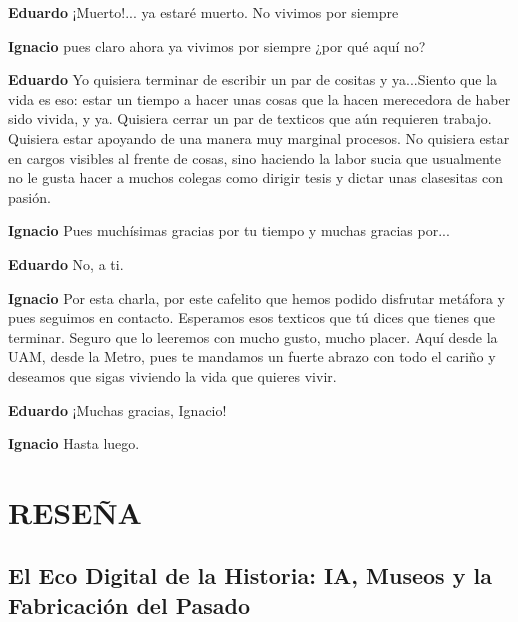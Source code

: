 \documentclass[
  spanish,
  11pt,
  a4paper,
]{scrbook}
\newenvironment{transcripcion}{
    \begin{list}{}{
        \setlength{\leftmargin}{1.5em}  %
        \setlength{\rightmargin}{0em}
        \setlength{\itemsep}{0.2em}     %
        \setlength{\parsep}{0.0em}
        \setlength{\listparindent}{0pt}
    }
}{
    \end{list}
}
\newcommand{\personaje}[1]{\textbf{#1}\quad}
\begin{document}
\begin{transcripcion}
\item \personaje{Eduardo} ¡Muerto!... ya estaré muerto. No vivimos por siempre

\item \personaje{Ignacio} pues claro ahora ya vivimos por siempre ¿por qué aquí no?

\item \personaje{Eduardo} Yo quisiera terminar de escribir un par de cositas y ya...Siento que la vida es eso: estar un tiempo a hacer unas cosas que la hacen merecedora de haber sido vivida, y ya. Quisiera cerrar un par de texticos que aún requieren trabajo. Quisiera estar apoyando de una manera muy marginal procesos. No quisiera estar en cargos visibles al frente de cosas, sino haciendo la labor sucia que usualmente no le gusta hacer a muchos colegas como dirigir tesis y dictar unas clasesitas con pasión.

\item \personaje{Ignacio} Pues muchísimas gracias por tu tiempo y muchas gracias por...

\item \personaje{Eduardo} No, a ti.

\item \personaje{Ignacio} Por esta charla, por este cafelito que hemos podido disfrutar metáfora y pues seguimos en contacto. Esperamos esos texticos que tú dices que tienes que terminar. Seguro que lo leeremos con mucho gusto, mucho placer. Aquí desde la UAM, desde la Metro, pues te mandamos un fuerte abrazo con todo el cariño y deseamos que sigas viviendo la vida que quieres vivir.

\item \personaje{Eduardo} ¡Muchas gracias, Ignacio!

\item \personaje{Ignacio} Hasta luego.
\end{transcripcion}

\part{RESEÑA}

\chapter{El Eco Digital de la Historia: IA, Museos y la Fabricación del
Pasado}\label{el-eco-digital-de-la-historia-ia-museos-y-la-fabricaciuxf3n-del-pasado}

\end{document}
